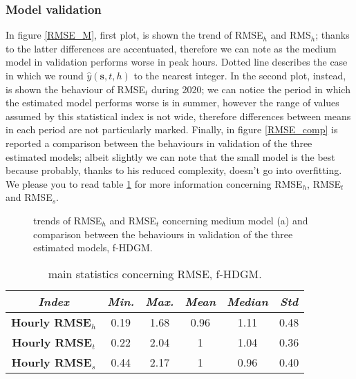 \subsubsection{Model validation}
In figure \ref{RMSE_M}, first plot, is shown the trend of RMSE$_h$ and RMS$_h$; thanks to the latter differences are accentuated, therefore we can note as the medium model in validation performs worse in peak hours. Dotted line describes the case in which we round $\hat{y}(\boldsymbol{s}, t, h)$ to the nearest integer. In the second plot, instead, is shown the behaviour of RMSE$_t$ during \num{2020}; we can notice the period in which the estimated model performs worse is in summer, however the range of values assumed by this statistical index is not wide, therefore differences between means in each period are not particularly marked. Finally, in figure \ref{RMSE_comp} is reported a comparison between the behaviours in validation of the three estimated models; albeit slightly we can note that the small model is the best because probably, thanks to his reduced complexity, doesn't go into overfitting. We please you to read table \ref{RMSE_f-HDGM_stats} for more information concerning RMSE$_h$, RMSE$_t$ and RMSE$_s$.

\begin{figure}
	\centering
	\quad
	\quad
	\caption[Trends of RMSE$_h$ and RMSE$_t$ concerning medium model and comparison between the behaviours in validation of the three estimated models (f-HDGM)]{trends of RMSE$_h$ and RMSE$_t$ concerning medium model (a) and comparison between the behaviours in validation of the three estimated models, f-HDGM.}
\end{figure}

\begin{table}
	\centering
	\renewcommand\arraystretch{1.3}
	\begin{tabular}{c|c|c|c|c|c}
		\hline
		\textit{Index} & \textit{Min.} & \textit{Max.} & \textit{Mean} & \textit{Median} & \textit{Std}\\
		\hline
		\textbf{Hourly RMSE$_h$} & \num{0.19} & \num{1.68} & \num{0.96} & \num{1.11} & \num{0.48}\\
		\hline
		\textbf{Hourly RMSE$_t$} & \num{0.22} & \num{2.04} & \num{1} & \num{1.04} & \num{0.36} \\
		\hline
		\textbf{Hourly RMSE$_s$} & \num{0.44} & \num{2.17} & \num{1} & \num{0.96} & \num{0.40}\\
		\hline
	\end{tabular}
	\caption[Main statistics concerning RMSE (f-HDGM)]{main statistics concerning RMSE, f-HDGM.}
	\label{RMSE_f-HDGM_stats}
\end{table}